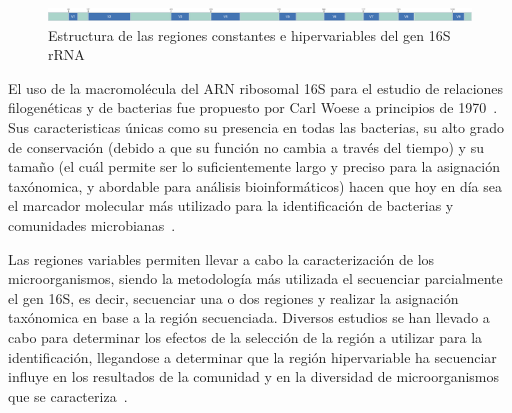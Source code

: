 \begin{figure}[H]
    \centering
    \includegraphics[width=1\linewidth]{images/16s_diagram-2.pdf}
    \caption{Estructura de las regiones constantes e hipervariables del gen 16S rRNA}
    \label{fig:16S_structure}
\end{figure}


El uso de la macromolécula del ARN ribosomal  16S para el estudio de relaciones filogenéticas y de bacterias fue propuesto por Carl Woese a principios de 1970~\cite{olsen1993ribosomal}.
Sus caracteristicas únicas como su presencia en todas las bacterias, su alto grado de conservación (debido a que su función no cambia a través del tiempo) y su tamaño (el cuál permite ser lo suficientemente largo y preciso para la asignación taxónomica, y abordable para análisis bioinformáticos) hacen que hoy en día sea el marcador molecular más utilizado para la identificación de bacterias y comunidades microbianas~\cite{reller2007detection,janda200716s,lopez2023determining,patel200116s}.


Las regiones variables permiten llevar a cabo la caracterización de los microorganismos, siendo la metodología más utilizada el secuenciar parcialmente el gen 16S, es decir, secuenciar una o dos regiones y realizar la asignación taxónomica en base a la región secuenciada. Diversos estudios se han llevado a cabo para determinar los efectos de la selección de la región a utilizar para la identificación, llegandose a determinar que la región hipervariable ha secuenciar influye en los resultados de la comunidad y en la diversidad de microorganismos que se caracteriza~\cite{klindworth2013evaluation,mizrahi2013taxonomic,guo2013taxonomic,soergel2012selection}.




